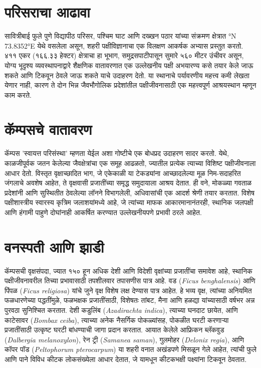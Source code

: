 \documentclass[a4paper,12pt,landscape]{memoir}
\newcommand{\introsection}[2]{%
  \begin{minipage}[t]{0.48\textwidth}
    \begin{mdframed}[
      linecolor=headingcolor,
      linewidth=1pt,
      roundcorner=5pt,
      leftmargin=0pt,
      rightmargin=0pt,
      backgroundcolor=headingcolor!5
    ]
      #1
    \end{mdframed}
  \end{minipage}\hfill
  \begin{minipage}[t]{0.48\textwidth}
    \begin{mdframed}[
      linecolor=headingcolor,
      linewidth=1pt,
      roundcorner=5pt,
      leftmargin=0pt,
      rightmargin=0pt,
      backgroundcolor=headingcolor!5
    ]
      #2
    \end{mdframed}
  \end{minipage}
  \newpage
}
\begin{document}
\introsection{%
  \section*{\textbf{परिसराचा आढावा}}
  सावित्रीबाई फुले पुणे विद्यापीठ परिसर, पश्चिम घाट आणि दख्खन पठार यांच्या संक्रमण क्षेत्रात {\latintext 18.5529°N 73.8352°E} येथे वसलेला असून, शहरी पक्षीविज्ञानाचा एक विलक्षण आकर्षक अभ्यास प्रस्तुत करतो. ४११ एकर (१६६.३३ हेक्टर) क्षेत्राचा हा भूभाग, समुद्रसपाटीपासून सुमारे ५६० मीटर उंचीवर असून, योग्य भूदृश्य व्यवस्थापनाद्वारे शैक्षणिक वातावरणात एक उल्लेखनीय पक्षी अभयारण्य कसे तयार केले जाऊ शकते आणि टिकवून ठेवले जाऊ शकते याचे उदाहरण देतो. या स्थानाचे पर्यावरणीय महत्त्व कमी लेखता येणार नाही, कारण ते दोन भिन्न जैवभौगोलिक प्रदेशांतील पक्षीजीवनासाठी एक महत्त्वपूर्ण आश्रयस्थान म्हणून काम करते.

  \section*{कॅम्पसचे वातावरण}
  कॅम्पस 'स्वायत्त परिसंस्था' म्हणता येईल अशा गोष्टीचे एक बोधप्रद उदाहरण सादर करतो. येथे, काळजीपूर्वक जतन केलेल्या जैवक्षेत्रांचा एक समूह आढळतो, ज्यातील प्रत्येक त्याच्या विशिष्ट पक्षीजीवनाला आधार देतो. विस्तृत वृक्षाच्छादित भाग, जे एकेकाळी या टेकड्यांना आच्छादलेल्या मूळ निम-सदाहरित जंगलाचे अवशेष आहेत, ते वृक्षवासी प्रजातींच्या समृद्ध समुदायाला आश्रय देतात. ही वने, मोकळ्या गवताळ प्रदेशांनी आणि सुस्थितीत ठेवलेल्या लॉनने विभागलेली, अधिवासांची एक आदर्श श्रेणी तयार करतात. विशेष पक्षीशास्त्रीय स्वारस्य कृत्रिम जलाशयांमध्ये आहे, जे त्यांच्या माफक आकारमानानंतरही, स्थानिक जलपक्षी आणि हंगामी पाहुणे दोघांनाही आकर्षित करण्यात उल्लेखनीयपणे प्रभावी ठरले आहेत.

  \section*{वनस्पती आणि झाडी}
  कॅम्पसची वृक्षसंपदा, ज्यात १५० हून अधिक देशी आणि विदेशी वृक्षांच्या प्रजातींचा समावेश आहे, स्थानिक पक्षीजीवनावरील तिच्या प्रभावासाठी तपशीलवार तपासणीस पात्र आहे. वड ({\latintext \textit{Ficus benghalensis}}) आणि पिंपळ ({\latintext \textit{Ficus religiosa}}) यांचे जुने वृक्ष विशेष लक्ष देण्यास पात्र आहेत. हे भव्य वृक्ष, त्यांच्या अनियमित फळधारणेच्या पद्धतींमुळे, फळभक्षक प्रजातींसाठी, विशेषतः तांबट, मैना आणि हळद्या यांच्यासाठी वर्षभर अन्न पुरवठा सुनिश्चित करतात. देशी कडुलिंब ({\latintext \textit{Azadirachta indica}}), त्याच्या घनदाट छायेत, आणि काटेसावर ({\latintext \textit{Bombax ceiba}}), त्याच्या अनेक नैसर्गिक पोकळ्यांसह, पोकळीत घरटी करणाऱ्या प्रजातींसाठी उत्कृष्ट घरटी बांधण्याची जागा प्रदान करतात. आयात केलेले आफ्रिकन ब्लॅकवुड ({\latintext \textit{Dalbergia melanoxylon}}), रेन ट्री ({\latintext \textit{Samanea saman}}), गुलमोहर ({\latintext \textit{Delonix regia}}), आणि कॉपर पॉड ({\latintext \textit{Peltophorum pterocarpum}}) या शहरी वनात अखंडपणे मिसळून गेले आहेत, त्यांची फुले आणि पाने विविध कीटक लोकसंख्येला आधार देतात, जे यामधून कीटकभक्षी पक्ष्यांना टिकवून ठेवतात.
}{%
}
\end{document}
